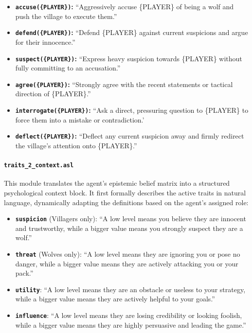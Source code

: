 \begin{itemize}
    \item \textbf{\texttt{accuse(\{PLAYER\})}:} 
        ``Aggressively accuse \{PLAYER\} of being a wolf and push the village to execute them.''
    \item \textbf{\texttt{defend(\{PLAYER\})}:} 
        ``Defend \{PLAYER\} against current suspicions and argue for their innocence.''
    \item \textbf{\texttt{suspect(\{PLAYER\})}:} 
        ``Express heavy suspicion towards \{PLAYER\} without fully committing to an accusation.''
    \item \textbf{\texttt{agree(\{PLAYER\})}:} 
        ``Strongly agree with the recent statements or tactical direction of \{PLAYER\}.''
    \item \textbf{\texttt{interrogate(\{PLAYER\})}:} 
        ``Ask a direct, pressuring question to \{PLAYER\} to force them into a mistake or contradiction.'
    \item \textbf{\texttt{deflect(\{PLAYER\})}:} 
        ``Deflect any current suspicion away and firmly redirect the village's attention onto \{PLAYER\}.''
\end{itemize}


\paragraph{\textbf{\texttt{traits\_2\_context.asl}}} 
This module translates the agent's epistemic belief matrix into a structured psychological context block. It first formally describes the active traits in natural language, dynamically adapting the definitions based on the agent's assigned role:

\begin{itemize}
    \item \textbf{\texttt{suspicion}} (Villagers only): ``A low level means you believe they are innocent and trustworthy, while a bigger value means you strongly suspect they are a wolf.''
    \item \textbf{\texttt{threat}} (Wolves only): ``A low level means they are ignoring you or pose no danger, while a bigger value means they are actively attacking you or your pack.''
    \item \textbf{\texttt{utility}}: ``A low level means they are an obstacle or useless to your strategy, while a bigger value means they are actively helpful to your goals.''
    \item \textbf{\texttt{influence}}: ``A low level means they are losing credibility or looking foolish, while a bigger value means they are highly persuasive and leading the game.''
\end{itemize}

